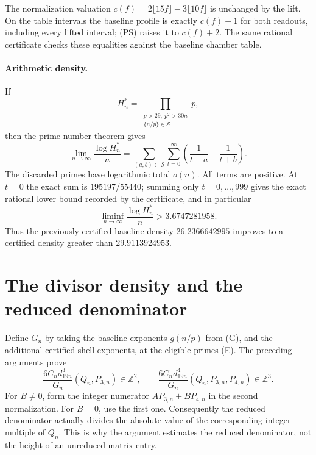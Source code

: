 \documentclass[11pt]{article}
\newcommand{\Z}{\mathbb Z}
\begin{document}
The normalization valuation
$c(f)=2\lfloor15f\rfloor-3\lfloor10f\rfloor$ is unchanged by the lift.
On the table intervals the baseline profile is exactly $c(f)+1$ for both
readouts, including every lifted interval; (PS) raises it to $c(f)+2$.
The same rational certificate checks these equalities against the
baseline chamber table.

\paragraph{Arithmetic density.}
If
\[
 H_n^*=\prod_{\substack{p>29,\ p^2>30n\\\{n/p\}\in\mathcal S}}p,
\]
then the prime number theorem gives
\[
 \lim_{n\to\infty}\frac{\log H_n^*}{n}
 =\sum_{(a,b)\subset\mathcal S}\sum_{t=0}^{\infty}
      \left(\frac1{t+a}-\frac1{t+b}\right).
\]
The discarded primes have logarithmic total $o(n)$.  All terms are
positive.  At $t=0$ the exact sum is $195197/55440$; summing only
$t=0,\ldots,999$ gives the exact rational lower bound recorded by the
certificate, and in particular
\[
 \liminf_{n\to\infty}\frac{\log H_n^*}{n}
       >3.6747281958.
\]
Thus the previously certified baseline density $26.2366642995$ improves
to a certified density greater than $29.9113924953$.


\section{The divisor density and the reduced denominator}
Define $G_n$ by taking the baseline exponents $g(n/p)$ from (G), and the
additional certified shell exponents, at the eligible primes (E).
The preceding arguments prove
\[
 \frac{6C_nd_{19n}^3}{G_n}(Q_n,P_{3,n})\in\Z^2,
 \qquad
 \frac{6C_nd_{19n}^4}{G_n}(Q_n,P_{3,n},P_{4,n})\in\Z^3.
 \tag{I}
\]
For $B\ne0$, form the integer numerator $AP_{3,n}+BP_{4,n}$ in the second
normalization. For $B=0$, use the first one. Consequently the reduced
denominator actually divides the absolute value of the corresponding
integer multiple of $Q_n$. This is why the argument estimates the
reduced denominator, not the height of an unreduced matrix entry.
\end{document}
